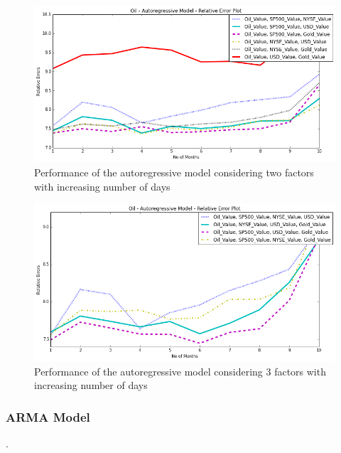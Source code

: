 \documentclass[runningheads]{llncs}
\begin{document}
\begin{figure}
\centering
\includegraphics[width=\textwidth]{oil_autoregressive_2factors_10.png}
\caption{Performance of the autoregressive model considering two factors with increasing number of days}
\label{fig:oil_autoregressive_2factors_10.png}
\end{figure}

\begin{figure}
\centering
\includegraphics[width=\textwidth]{oil_autoregressive_3factors_10.png}
\caption{Performance of the autoregressive model considering 3 factors with increasing number of days}
\label{fig:oil_autoregressive_3factors_10.png}
\end{figure}

\newpage
\subsubsection {ARMA Model}.\\
\end{document}
